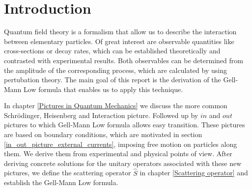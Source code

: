 \documentclass[
12pt, %
english, %
singlespacing, %
headsepline, %
]{MastersDoctoralThesis} %
\begin{document}
\chapter{Introduction}\label{Introduction}
Quantum field theory is a formalism that allow us to describe the interaction between elementary particles. Of great interest are observable quantities like cross-sections or decay rates, which can be established theoretically and contrasted with experimental results. Both observables can be determined from the amplitude of the corresponding process, which are calculated by using pertubation theory. The main goal of this report is the derivation of the Gell-Mann Low formula that enables us  to apply this technique.
 
In chapter \ref{Pictures in Quantum Mechanics} we discuss the more common Schrödinger, Heisenberg and Interaction picture. Followed up by $ in $ and $ out $ pictures to which Gell-Mann Low formula allows easy transition. These pictures are based on boundary conditions, which are motivated in section \ref{in_out_picture_external_currents}, imposing free motion on particles along them. We derive them from experimental and physical points of view. After deriving concrete solutions for the unitary operators associated with these new pictures, we define the scattering operator $ \hat{S} $ in chapter \ref{Scattering operator} and establish the Gell-Mann Low formula.
\end{document}
